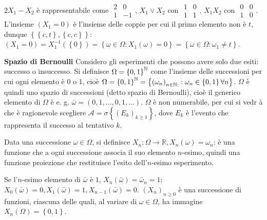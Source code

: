 \documentclass{article}
\begin{document}
\begin{enumerate}
$2X_{1}-X_{2}$ \`{e} rappresentabile come $%
\begin{array}{cc}
2 & 0 \\ 
1 & -1%
\end{array}%
$, $X_{1}\vee X_{2}$ con $%
\begin{array}{cc}
1 & 0 \\ 
1 & 1%
\end{array}%
$, $X_{1}X_{2}$ con $%
\begin{array}{cc}
0 & 0 \\ 
1 & 0%
\end{array}%
$. L'insieme $\left( X_{1}=0\right) $ \`{e} l'insieme delle coppie per cui
il primo elemento non \`{e} $t$, dunque $\left\{ \left\{ c,t\right\}
,\left\{ c,c\right\} \right\} $: $\left( X_{1}=0\right) =X_{1}^{-1}\left(
\left\{ 0\right\} \right) =\left\{ \omega \in \Omega :X_{1}\left( \omega
\right) =0\right\} =\left\{ \omega \in \Omega :\omega _{1}\neq t\right\} $.
\end{enumerate}

\textbf{Spazio di Bernoulli }Considero gli esperimenti che possono avere
solo due esiti: successo o insuccesso. Si definisce $\Omega =\left\{
0,1\right\} ^{%
\mathbb{N}
}$ come l'insieme delle successioni per cui ogni elemento \`{e} $0$ o $1$,
cio\`{e} $\Omega =\left\{ 0,1\right\} ^{%
\mathbb{N}
}=\left\{ \left( \omega _{n}\right) _{n\in 
\mathbb{N}
:}:\omega _{n}\in \left\{ 0,1\right\} \forall n\right\} $. $\Omega $ \`{e}
quindi uno spazio di successioni (detto spazio di Bernoulli), cio\`{e} il
generico elemento di $\Omega $ \`{e} e. g. $\bar{\omega}=\left(
0,1,...,0,1,...\right) $. $\Omega $ \`{e} non numerabile, per cui si vedr%
\`{a} che \`{e} ragionevole scegliere $\mathcal{A}=\sigma \left\{ \left(
E_{k}\right) _{k\geq 1}\right\} $, dove $E_{k}$ \`{e} l'evento che
rappresenta il successo al tentativo $k$.

Data una successione $\omega \in \Omega $, si definisce $X_{n}:\Omega
\rightarrow 
\mathbb{R}
,X_{n}\left( \omega \right) =\omega _{n}$: \`{e} una funzione che a ogni
successione associa il suo elemento $n$-esimo, quindi una funzione
proiezione che restituisce l'esito dell'$n$-esimo esperimento.

Se l'$n$-esimo elemento di $\bar{\omega}$ \`{e} $1$, $X_{n}\left( \bar{\omega%
}\right) =\bar{\omega}_{n}=1$; $X_{0}\left( \bar{\omega}\right)
=0,X_{1}\left( \bar{\omega}\right) =1,X_{n-1}\left( \bar{\omega}\right) =0$. 
$\left( X_{n}\right) _{n\geq 0}$ \`{e} una successione di funzioni, ciascuna
delle quali, al variare di $\omega \in \Omega $, ha immagine $X_{n}\left(
\Omega \right) =\left\{ 0,1\right\} $.
\end{document}
